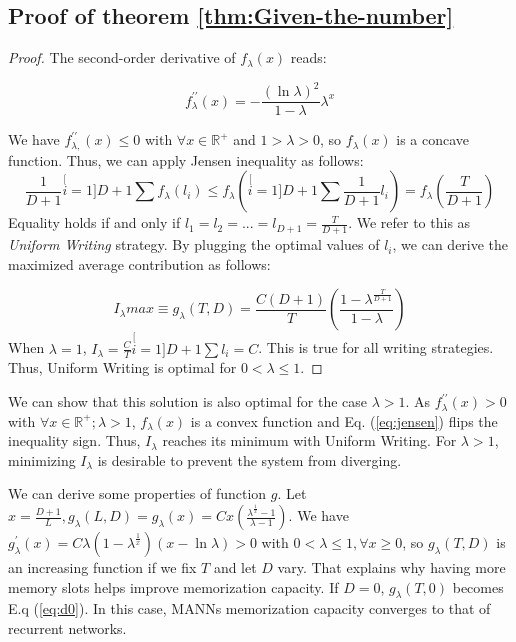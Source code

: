 \subsection{Proof of theorem \ref{thm:Given-the-number}\label{subsec:Proof-of-theorem}}
\begin{proof}
The second-order derivative of $f_{\lambda}\left(x\right)$ reads:

\begin{equation}
f_{\lambda}^{\prime\prime}\left(x\right)=-\frac{\left(\ln\lambda\right)^{2}}{1-\lambda}\lambda^{x}
\end{equation}

We have $f_{\lambda,}^{\prime\prime}\left(x\right)\leq0$ with $\forall x\in\mathbb{R^{+}}$
and $1>\lambda>0$, so $f_{\lambda}\left(x\right)$ is a concave function.
Thus, we can apply Jensen inequality as follows: 
\begin{equation}
\frac{1}{D+1}\stackrel[i=1]{D+1}{\sum}f_{\lambda}(l_{i})\leq f_{\lambda}\left(\stackrel[i=1]{D+1}{\sum}\frac{1}{D+1}l_{i}\right)=f_{\lambda}\left(\frac{T}{D+1}\right)\label{eq:jensen}
\end{equation}
Equality holds if and only if $l_{1}=l_{2}=...=l_{D+1}=\frac{T}{D+1}$.
We refer to this as\textit{ Uniform Writing} strategy. By plugging
the optimal values of $l_{i}$, we can derive the maximized average
contribution as  follows:

\begin{equation}
I_{\lambda}max\equiv g_{\lambda}\left(T,D\right)=\frac{C\left(D+1\right)}{T}\left(\frac{1-\lambda^{\frac{T}{D+1}}}{1-\lambda}\right)
\end{equation}
When $\lambda=1$, $I_{\lambda}=\frac{C}{T}\stackrel[i=1]{D+1}{\sum}l_{i}=C$.
This is true for all writing strategies. Thus, Uniform Writing is
optimal for $0<\lambda\leq1$.
\end{proof}
We can show that this solution is also optimal for the case $\lambda>1$.
As $f_{\lambda}^{\prime\prime}\left(x\right)>0$ with $\forall x\in\mathbb{R^{+}};\lambda>1$,
$f_{\lambda}\left(x\right)$ is a convex function and Eq. (\ref{eq:jensen})
flips the inequality sign. Thus, $I_{\lambda}$ reaches its minimum
with Uniform Writing. For $\lambda>1$, minimizing $I_{\lambda}$
is desirable to prevent the system from diverging. 

We can derive some properties of function $g$. Let $x=\frac{D+1}{L},g_{\lambda}\left(L,D\right)=g_{\lambda}\left(x\right)=Cx(\frac{\lambda^{\frac{1}{x}}-1}{\lambda-1})$.
We have $g_{\lambda}^{\prime}\left(x\right)=C\lambda\left(1-\lambda^{\frac{1}{x}}\right)\left(x-\ln\lambda\right)>0$
with $0<\lambda\leq1,\forall x\geq0$, so $g_{\lambda}\left(T,D\right)$
is an increasing function if we fix $T$ and let $D$ vary. That explains
why having more memory slots helps improve memorization capacity.
If $D=0$, $g_{\lambda}\left(T,0\right)$ becomes E.q (\ref{eq:d0}).
In this case, MANNs memorization capacity converges to that of recurrent
networks.

